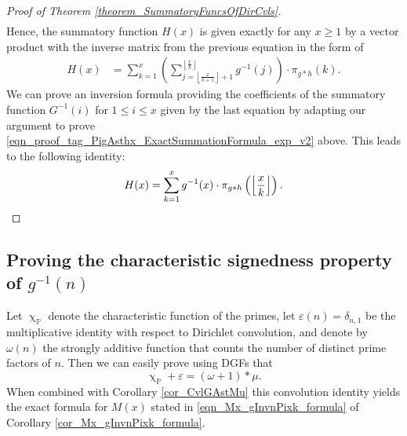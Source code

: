 \documentclass[11pt,reqno,a4letter]{article}
\numberwithin{figure}{section}
\numberwithin{table}{section}
\newcommand{\floor}[1]{\left\lfloor #1 \right\rfloor}
\renewcommand{\chi}{\upchi}
\newcommand{\Floor}[2]{\ensuremath{\left\lfloor \frac{#1}{#2} \right\rfloor}}
\theoremstyle{plain}
\numberwithin{theorem}{section}
\theoremstyle{definition}
\begin{document}
\begin{proof}[Proof of Theorem \ref{theorem_SummatoryFuncsOfDirCvls}]
\begin{align*}
\end{align*} 
Hence, the summatory function $H(x)$ is given exactly for any $x \geq 1$ 
by a vector product with the inverse matrix from the previous equation in the form of 
\begin{align*} 
H(x) & = \sum_{k=1}^x \left(\sum_{j=\floor{\frac{x}{k+1}}+1}^{\floor{\frac{x}{k}}} g^{-1}(j)\right) 
     \cdot \pi_{g \ast h}(k). 
\end{align*} 
We can prove an inversion formula providing the coefficients of the summatory function 
$G^{-1}(i)$ for $1 \leq i \leq x$ given 
by the last equation by adapting our argument to prove 
\eqref{eqn_proof_tag_PigAsthx_ExactSummationFormula_exp_v2} above. 
This leads to the following identity: 
\[
H(x) = \sum_{k=1}^{x} g^{-1}(x) \cdot \pi_{g \ast h}\left(\Floor{x}{k}\right). 
     \qedhere 
\]
\end{proof} 

\subsection{Proving the characteristic signedness property of $g^{-1}(n)$} 

Let $\chi_{\mathbb{P}}$ denote the characteristic function of the primes, let 
$\varepsilon(n) = \delta_{n,1}$ be the multiplicative identity with respect to Dirichlet convolution, 
and denote by $\omega(n)$ the strongly additive function that counts the number of 
distinct prime factors of $n$. Then we can easily prove using DGFs that 
\begin{equation}
\label{eqn_AntiqueDivisorSumIdent} 
\chi_{\mathbb{P}} + \varepsilon = (\omega + 1) \ast \mu. 
\end{equation} 
When combined with Corollary \ref{cor_CvlGAstMu} 
this convolution identity yields the exact 
formula for $M(x)$ stated in \eqref{eqn_Mx_gInvnPixk_formula} of 
Corollary \ref{cor_Mx_gInvnPixk_formula}. 
\end{document}
